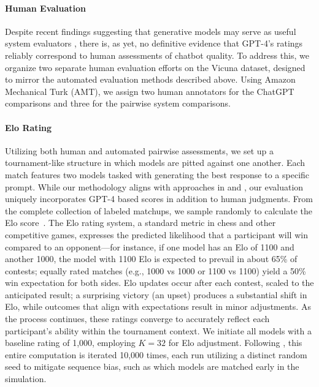 \paragraph{Human Evaluation} Despite recent findings suggesting that generative models may serve as useful system evaluators \citep{fu2023gptscore}, there is, as yet, no definitive evidence that GPT-4’s ratings reliably correspond to human assessments of chatbot quality. To address this, we organize two separate human evaluation efforts on the Vicuna dataset, designed to mirror the automated evaluation methods described above. Using Amazon Mechanical Turk (AMT), we assign two human annotators for the ChatGPT comparisons and three for the pairwise system comparisons.

\paragraph{Elo Rating} Utilizing both human and automated pairwise assessments, we set up a tournament-like structure in which models are pitted against one another. Each match features two models tasked with generating the best response to a specific prompt. While our methodology aligns with approaches in \citet{bai2022training} and \citet{vicuna2023}, our evaluation uniquely incorporates GPT-4 based scores in addition to human judgments. From the complete collection of labeled matchups, we sample randomly to calculate the Elo score~\citep{elo1967proposed,elo1978rating}. The Elo rating system, a standard metric in chess and other competitive games, expresses the predicted likelihood that a participant will win compared to an opponent—for instance, if one model has an Elo of 1100 and another 1000, the model with 1100 Elo is expected to prevail in about 65\% of contests; equally rated matches (e.g., 1000 vs 1000 or 1100 vs 1100) yield a 50\% win expectation for both sides. Elo updates occur after each contest, scaled to the anticipated result; a surprising victory (an upset) produces a substantial shift in Elo, while outcomes that align with expectations result in minor adjustments. As the process continues, these ratings converge to accurately reflect each participant’s ability within the tournament context. We initiate all models with a baseline rating of 1,000, employing $K=32$ for Elo adjustment. Following \citet{vicuna2023}, this entire computation is iterated 10,000 times, each run utilizing a distinct random seed to mitigate sequence bias, such as which models are matched early in the simulation.

